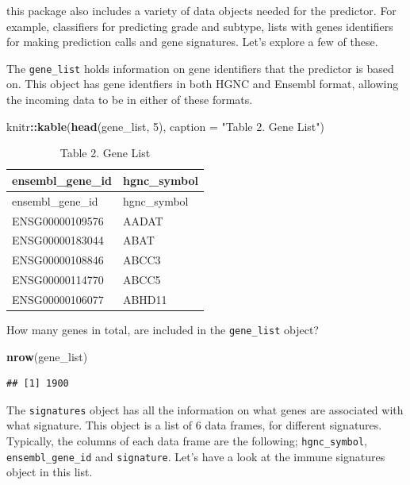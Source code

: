 \documentclass[
]{article}
\newenvironment{Shaded}{\begin{snugshade}}{\end{snugshade}}
\newcommand{\AttributeTok}[1]{\textcolor[rgb]{0.13,0.29,0.53}{#1}}
\newcommand{\DecValTok}[1]{\textcolor[rgb]{0.00,0.00,0.81}{#1}}
\newcommand{\FunctionTok}[1]{\textcolor[rgb]{0.13,0.29,0.53}{\textbf{#1}}}
\newcommand{\NormalTok}[1]{#1}
\newcommand{\SpecialCharTok}[1]{\textcolor[rgb]{0.81,0.36,0.00}{\textbf{#1}}}
\newcommand{\StringTok}[1]{\textcolor[rgb]{0.31,0.60,0.02}{#1}}
\begin{document}
this package also includes a variety of data objects needed for the
predictor. For example, classifiers for predicting grade and subtype,
lists with genes identifiers for making prediction calls and gene
signatures. Let's explore a few of these.

The \texttt{gene\_list} holds information on gene identifiers that the
predictor is based on. This object has gene identfiers in both HGNC and
Ensembl format, allowing the incoming data to be in either of these
formats.

\begin{Shaded}
\begin{Highlighting}[]
\NormalTok{knitr}\SpecialCharTok{::}\FunctionTok{kable}\NormalTok{(}\FunctionTok{head}\NormalTok{(gene\_list, }\DecValTok{5}\NormalTok{),}
             \AttributeTok{caption =} \StringTok{"Table 2. Gene List"}\NormalTok{)}
\end{Highlighting}
\end{Shaded}

\begin{longtable}[]{@{}ll@{}}
\caption{Table 2. Gene List}\tabularnewline
\toprule\noalign{}
ensembl\_gene\_id & hgnc\_symbol \\
\midrule\noalign{}
\endfirsthead
\toprule\noalign{}
ensembl\_gene\_id & hgnc\_symbol \\
\midrule\noalign{}
\endhead
\bottomrule\noalign{}
\endlastfoot
ENSG00000109576 & AADAT \\
ENSG00000183044 & ABAT \\
ENSG00000108846 & ABCC3 \\
ENSG00000114770 & ABCC5 \\
ENSG00000106077 & ABHD11 \\
\end{longtable}

How many genes in total, are included in the \texttt{gene\_list} object?

\begin{Shaded}
\begin{Highlighting}[]
\FunctionTok{nrow}\NormalTok{(gene\_list)}
\end{Highlighting}
\end{Shaded}

\begin{verbatim}
## [1] 1900
\end{verbatim}

The \texttt{signatures} object has all the information on what genes are
associated with what signature. This object is a list of 6 data frames,
for different signatures. Typically, the columns of each data frame are
the following; \texttt{hgnc\_symbol}, \texttt{ensembl\_gene\_id} and
\texttt{signature}. Let's have a look at the immune signatures object in
this list.
\end{document}
